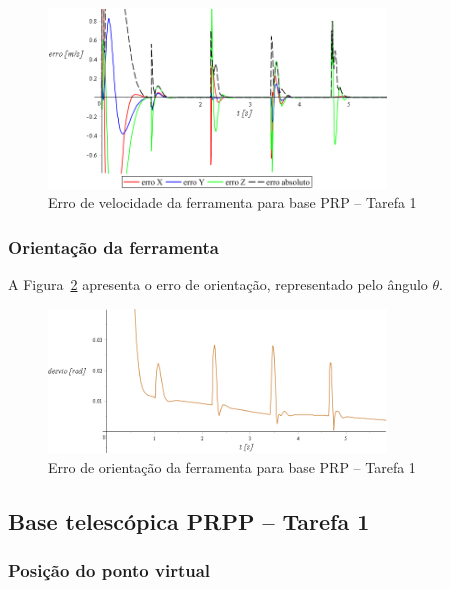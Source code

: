 \begin{figure}[h!]
	\centering 
 	\includegraphics[width=0.80\textwidth]{figs/t1_errovelf_base_prp}
 	\caption{Erro de velocidade da ferramenta para base PRP --
 	Tarefa 1}
 	\label{fig::t1_errovelf_base_prp}
\end{figure}


\subsubsection{Orientação da ferramenta}

A Figura~\ref{fig::t1_erroori_base_prp} apresenta o erro de orientação,
representado pelo ângulo $\theta$.

\begin{figure}[h!]
	\centering 
 	\includegraphics[width=0.80\textwidth]{figs/t1_erroori_base_prp}
 	\caption{Erro de orientação da ferramenta para base PRP -- Tarefa
 	1}
 	\label{fig::t1_erroori_base_prp}
\end{figure}



\subsection{Base telescópica PRPP -- Tarefa 1} \label{sec::res_prpp}

\subsubsection{Posição do ponto virtual}

